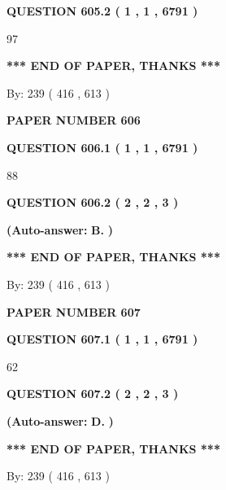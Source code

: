 \documentclass[12pt]{article}
\begin{document}
  
{\textbf{\large{QUESTION
605.2 
 ( 1 , 1 , 6791 )
}}}

97
   
   
   
   
\vspace{1.0in} 
{\textbf{\large{ *** END OF PAPER, THANKS *** }}} 
   
   
\hspace{1.0in} By: 
 239 ( 416 ,  613 )
   
   
   
   
\newpage 
\setcounter{page}{ 
   606001 } 
   
   
 {\textbf{ \Large{ PAPER NUMBER  606  }}}
   
   
   
   
  
  
{\textbf{\large{QUESTION
606.1 
 ( 1 , 1 , 6791 )
}}}

88
  
  
{\textbf{\large{QUESTION
606.2 
 ( 2 , 2 , 3 )
}}}
 
 
{\textbf{(Auto-answer:}}
{\textbf{\large{
B.}}}
{\textbf{)}}
 
 
   
   
   
   
\vspace{1.0in} 
{\textbf{\large{ *** END OF PAPER, THANKS *** }}} 
   
   
\hspace{1.0in} By: 
 239 ( 416 ,  613 )
   
   
   
   
\newpage 
\setcounter{page}{ 
   607001 } 
   
   
 {\textbf{ \Large{ PAPER NUMBER  607  }}}
   
   
   
   
  
  
{\textbf{\large{QUESTION
607.1 
 ( 1 , 1 , 6791 )
}}}

62
  
  
{\textbf{\large{QUESTION
607.2 
 ( 2 , 2 , 3 )
}}}
 
 
{\textbf{(Auto-answer:}}
{\textbf{\large{
D.}}}
{\textbf{)}}
 
 
   
   
   
   
\vspace{1.0in} 
{\textbf{\large{ *** END OF PAPER, THANKS *** }}} 
   
   
\hspace{1.0in} By: 
 239 ( 416 ,  613 )
   
   
   
\end{document}
